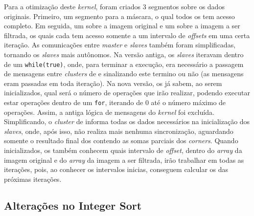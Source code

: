 \documentclass[a4paper,11pt]{article}
\begin{document}
Para a otimização deste \textit{kernel}, foram criados 3 segmentos sobre os dados originais. Primeiro, um segmento para a máscara, o qual todos os \ccs tem acesso completo. Em seguida, um sobre a imagem original e um sobre a imagem a ser filtrada, os quais cada \cc tem acesso somente a um intervalo de \textit{offsets} em uma certa iteração. As comunicações entre \textit{master} e \textit{slaves} também foram simplificadas, tornando os \textit{slaves} mais autônomos. Na versão antiga, os \textit{slaves} iteravam dentro de um \texttt{while(true)}, onde, para terminar a execução, era necessário a passagem de mensagens entre \textit{clusters} de \io e \ccs sinalizando este termino ou não (as mensagens eram passadas em toda iteração). Na nova versão, os \ccs já sabem, ao serem inicializados, qual será o número de operações que irão realizar, podendo executar estar operações dentro de um \texttt{for}, iterando de 0 até o número máximo de operações. Assim, a antiga lógica de mensagens do \textit{kernel} foi excluída. Simplificando, o \textit{cluster} de \io informa todas os dados necessários na inicialização dos \textit{slaves}, onde, após isso, não realiza mais nenhuma sincronização, aguardando somente o resultado final dos \ccs contendo as somas parciais dos \textit{corners}.  Quando inicializados, os \ccs também conhecem quais intervalo de \textit{offset}, dentro do \textit{array} da imagem original e do \textit{array} da imagem a ser filtrada, irão trabalhar em todas as iterações, pois, ao conhecer os intervalos inicias, conseguem calcular os das próximas iterações.

\subsection{Alterações no Integer Sort}
\end{document}
